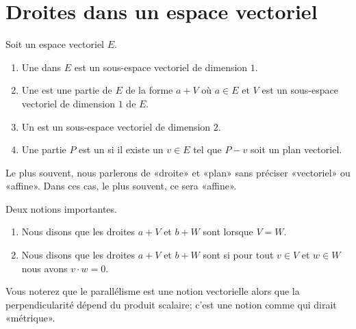 

\section{Droites dans un espace vectoriel}


\begin{definition}      \label{DEFooTQIFooKcloeY}
	Soit un espace vectoriel \( E\).
	\begin{enumerate}
		\item
		      Une  dans \( E\) est un sous-espace vectoriel de dimension \( 1\).
		\item
		      Une  est une partie de \( E\) de la forme \( a+V\) où \( a\in E\) et \( V\) est un sous-espace vectoriel de dimension \( 1\) de \( E\).
		\item
		      Un  est un sous-espace vectoriel de dimension \( 2\).
		\item		\label{ITEMooQNAYooZymIqK}
		      Une partie \( P\) est un  si il existe un \( v\in E\) tel que \( P-v\) soit un plan vectoriel.
	\end{enumerate}
	Le plus souvent, nous parlerons de «droite» et «plan» sans préciser «vectoriel» ou «affine». Dans ces cas, le plus souvent, ce sera «affine».
\end{definition}

\begin{definition}
	Deux notions importantes.
	\begin{enumerate}
		\item
		      Nous disons que les droites \( a+V\) et \( b+W\) sont  lorsque \( V=W\).
		\item
		      Nous disons que les droites \( a+V\) et \( b+W\) sont  si pour tout \( v\in V\) et \( w\in W\) nous avons \( v\cdot w=0\).
	\end{enumerate}
	Vous noterez que le parallélisme est une notion vectorielle alors que la perpendicularité dépend du produit scalaire; c'est une notion comme qui dirait «métrique».
\end{definition}

